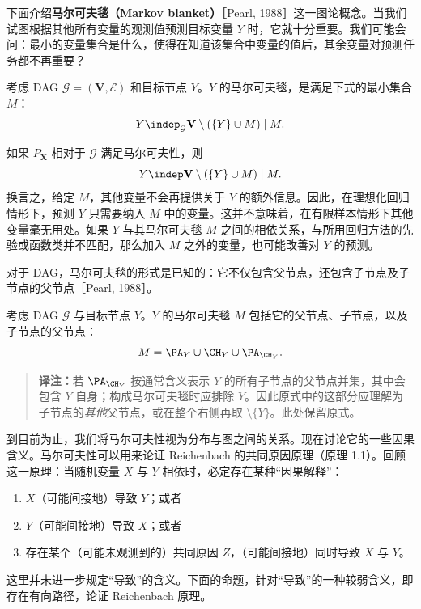 

下面介绍\textbf{马尔可夫毯（Markov blanket）}［Pearl, 1988］这一图论概念。当我们试图根据其他所有变量的观测值预测目标变量 $Y$ 时，它就十分重要。我们可能会问：最小的变量集合是什么，使得在知道该集合中变量的值后，其余变量对预测任务都不再重要？

\begin{definition}[马尔可夫毯]
考虑 DAG $\mathcal G=(\mathbf V,\mathcal E)$ 和目标节点 $Y$。$Y$ 的马尔可夫毯，是满足下式的最小集合 $M$：
\[
 Y\indep_{\mathcal G}\mathbf V\setminus(\{Y\}\cup M)\mid M.
\]
\end{definition}
如果 $P_{\mathbf X}$ 相对于 $\mathcal G$ 满足马尔可夫性，则
\[
 Y\indep\mathbf V\setminus(\{Y\}\cup M)\mid M.
\]
换言之，给定 $M$，其他变量不会再提供关于 $Y$ 的额外信息。因此，在理想化回归情形下，预测 $Y$ 只需要纳入 $M$ 中的变量。这并不意味着，在有限样本情形下其他变量毫无用处。如果 $Y$ 与其马尔可夫毯 $M$ 之间的相依关系，与所用回归方法的先验或函数类并不匹配，那么加入 $M$ 之外的变量，也可能改善对 $Y$ 的预测。

对于 DAG，马尔可夫毯的形式是已知的：它不仅包含父节点，还包含子节点及子节点的父节点［Pearl, 1988］。

\begin{proposition}[马尔可夫毯]
考虑 DAG $\mathcal G$ 与目标节点 $Y$。$Y$ 的马尔可夫毯 $M$ 包括它的父节点、子节点，以及子节点的父节点：
\[
 M=\PA_Y\cup\CH_Y\cup\PA_{\CH_Y}.
\]
\end{proposition}
\begin{quote}\small
\textbf{译注：}若 $\PA_{\CH_Y}$ 按通常含义表示 $Y$ 的所有子节点的父节点并集，其中会包含 $Y$ 自身；构成马尔可夫毯时应排除 $Y$。因此原式中的这部分应理解为子节点的\emph{其他}父节点，或在整个右侧再取 $\setminus\{Y\}$。此处保留原式。
\end{quote}

到目前为止，我们将马尔可夫性视为分布与图之间的关系。现在讨论它的一些因果含义。马尔可夫性可以用来论证 Reichenbach 的共同原因原理（原理 1.1）。回顾这一原理：当随机变量 $X$ 与 $Y$ 相依时，必定存在某种“因果解释”：
\begin{enumerate}[label=(\roman*)]
 \item $X$（可能间接地）导致 $Y$；或者
 \item $Y$（可能间接地）导致 $X$；或者
 \item 存在某个（可能未观测到的）共同原因 $Z$，（可能间接地）同时导致 $X$ 与 $Y$。
\end{enumerate}
这里并未进一步规定“导致”的含义。下面的命题，针对“导致”的一种较弱含义，即存在有向路径，论证 Reichenbach 原理。

